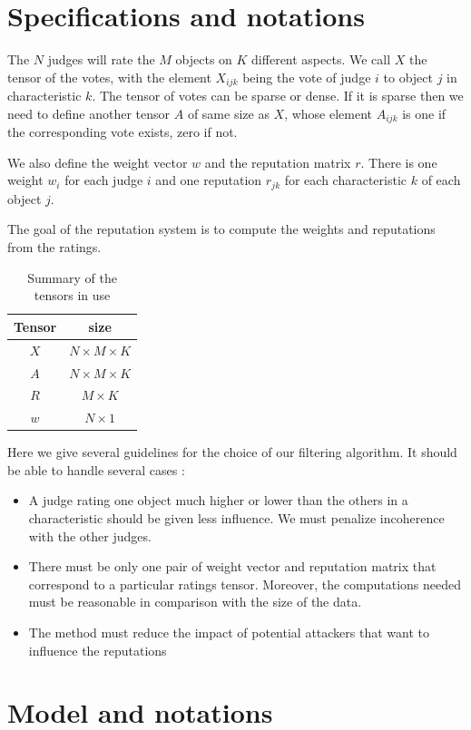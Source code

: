 \documentclass[12pt,a4paper]{article}
\begin{document}
\section{Specifications and notations}
The $N$ judges will rate the $M$ objects on $K$ different aspects. We call $X$ the tensor of the votes, with the element $X_{ijk}$ being the vote of judge $i$ to object $j$ in characteristic $k$. The tensor of votes can be sparse or dense. If it is sparse then we need to define another tensor $A$ of same size as $X$, whose element $A_{ijk}$ is one if the corresponding vote exists, zero if not.

We also define the weight vector $w$ and the reputation matrix $r$. There is one weight $w_i$ for each judge $i$ and one reputation $r_{jk}$ for each characteristic $k$ of each object $j$.

The goal of the reputation system is to compute the weights and reputations from the ratings.

\begin{table}
\centering
\begin{tabular}{|c|c|}
\hline 
Tensor & size\\
\hline
$X$ & $N\times M \times K$\\
\hline
$A$ & $N\times M \times K$\\
\hline
$R$ & $M\times K$\\
\hline
$w$ & $N\times 1$\\
\hline
\end{tabular}
\caption{Summary of the tensors in use}
\end{table}

Here we give several guidelines for the choice of our filtering algorithm. It should be able to handle several cases :
\begin{itemize}
\item A judge rating one object much higher or lower than the others in a characteristic should be given less influence. We must penalize incoherence with the other judges.
\item There must be only one pair of weight vector and reputation matrix that correspond to a particular ratings tensor. Moreover, the computations needed must be reasonable in comparison with the size of the data.
\item The method must reduce the impact of potential attackers that want to influence the reputations
\end{itemize}

\section{Model and notations}
\end{document}
